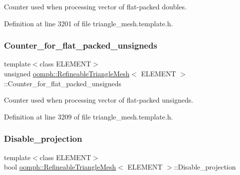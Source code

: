 Counter used when processing vector of flat-\/packed doubles. 



Definition at line 3201 of file triangle\+\_\+mesh.\+template.\+h.

\mbox{\label{classoomph_1_1RefineableTriangleMesh_a5bb1b8a504779c77968538fe612a157d}} 
\subsubsection{\texorpdfstring{Counter\+\_\+for\+\_\+flat\+\_\+packed\+\_\+unsigneds}{Counter\_for\_flat\_packed\_unsigneds}}
{\footnotesize\ttfamily template$<$class E\+L\+E\+M\+E\+NT$>$ \\
unsigned \hyperlink{classoomph_1_1RefineableTriangleMesh}{oomph\+::\+Refineable\+Triangle\+Mesh}$<$ E\+L\+E\+M\+E\+NT $>$\+::Counter\+\_\+for\+\_\+flat\+\_\+packed\+\_\+unsigneds\hspace{0.3cm}{\ttfamily [protected]}}



Counter used when processing vector of flat-\/packed unsigneds. 



Definition at line 3209 of file triangle\+\_\+mesh.\+template.\+h.

\mbox{\label{classoomph_1_1RefineableTriangleMesh_a7825ce22a479fecd30361ae09750f15a}} 
\subsubsection{\texorpdfstring{Disable\+\_\+projection}{Disable\_projection}}
{\footnotesize\ttfamily template$<$class E\+L\+E\+M\+E\+NT$>$ \\
bool \hyperlink{classoomph_1_1RefineableTriangleMesh}{oomph\+::\+Refineable\+Triangle\+Mesh}$<$ E\+L\+E\+M\+E\+NT $>$\+::Disable\+\_\+projection\hspace{0.3cm}{\ttfamily [protected]}}



